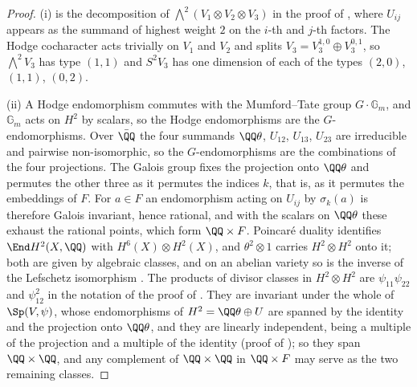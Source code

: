 \begin{proof}
(i) is the decomposition of $\bigwedge^{2}(V_{1}\otimes V_{2}\otimes V_{3})$
in the proof of , where $U_{ij}$ appears as the
summand of highest weight $2$ on the $i$-th and $j$-th factors. The Hodge
cocharacter acts trivially on $V_{1}$ and $V_{2}$ and splits
$V_{3}=V_{3}^{1,0}\oplus V_{3}^{0,1}$, so $\bigwedge^{2}V_{3}$ has type
$(1,1)$ and $S^{2}V_{3}$ has one dimension of each of the types $(2,0)$,
$(1,1)$, $(0,2)$.

(ii) A Hodge endomorphism commutes with the Mumford--Tate group
$G\cdot\mathbb{G}_{m}$, and $\mathbb{G}_{m}$ acts on $H^{2}$ by scalars, so
the Hodge endomorphisms are the $G$-endomorphisms. Over $\bar{\QQ}$ the four
summands $\QQ\theta$, $U_{12}$, $U_{13}$, $U_{23}$ are irreducible and
pairwise non-isomorphic, so the $G$-endomorphisms are the combinations of the
four projections. The Galois group fixes the projection onto $\QQ\theta$ and
permutes the other three as it permutes the indices $k$, that is, as it
permutes the embeddings of $F$. For $a\in F$ an endomorphism acting on
$U_{ij}$ by $\sigma_{k}(a)$ is therefore Galois invariant, hence rational, and
with the scalars on $\QQ\theta$ these exhaust the rational points, which form
$\QQ\times F$. Poincar\'e duality identifies $\End H^{2}(X,\QQ)$ with
$H^{6}(X)\otimes H^{2}(X)$, and $\theta^{2}\otimes1$ carries
$H^{2}\otimes H^{2}$ onto it; both are given by algebraic classes, and on an
abelian variety so is the inverse of the Lefschetz isomorphism
\cite[\S2]{Kle68}. The products of divisor classes in $H^{2}\otimes H^{2}$
are $\psi_{11}\psi_{22}$ and $\psi_{12}^{2}$ in the notation of the proof of
. They are invariant under the whole of
$\Sp(V,\psi)$, whose endomorphisms of $H^{2}=\QQ\theta\oplus U$ are spanned
by the identity and the projection onto $\QQ\theta$, and they are linearly
independent, being a multiple of the projection and a multiple of the
identity (proof of ); so they span $\QQ\times\QQ$, and any complement of
$\QQ\times\QQ$ in $\QQ\times F$ may serve as the two remaining classes.


\end{proof}
